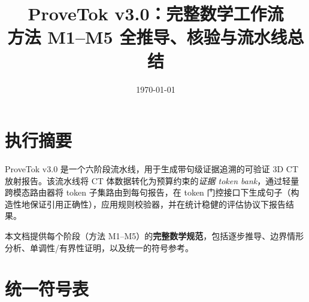 \documentclass[11pt,a4paper]{article}
\title{\textbf{ProveTok v3.0：完整数学工作流}\\[6pt]
\large 方法 M1--M5 全推导、核验与流水线总结}
\date{\today}
\theoremstyle{definition}
\begin{document}
\maketitle
\tableofcontents
\newpage

\section{执行摘要}

ProveTok v3.0 是一个六阶段流水线，用于生成带句级证据追溯的可验证 3D CT 放射报告。该流水线将 CT 体数据转化为预算约束的\emph{证据 token bank}，通过轻量跨模态路由器将 token 子集路由到每句报告，在 token 门控接口下生成句子（构造性地保证引用正确性），应用规则校验器，并在统计稳健的评估协议下报告结果。

本文档提供每个阶段（方法 M1--M5）的\textbf{完整数学规范}，包括逐步推导、边界情形分析、单调性/有界性证明，以及统一的符号参考。

\section{统一符号表}
\end{document}
